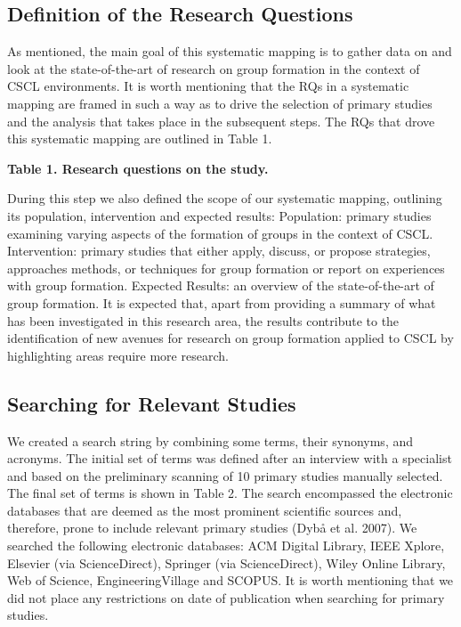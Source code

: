 \subsection{Definition of the Research Questions}
 
As mentioned, the main goal of this systematic mapping is to gather data on and look at the state-of-the-art of research on group formation in the context of CSCL environments. It is worth mentioning that the RQs in a systematic mapping are framed in such a way as to drive the selection of primary studies and the analysis that takes place in the subsequent steps. The RQs that drove this systematic mapping are outlined in Table 1.

\textbf{Table 1. Research questions on the study.}

During this step we also defined the scope of our systematic mapping, outlining its population, intervention and expected results: 
Population: primary studies examining varying aspects of the formation of groups in the context of CSCL.
Intervention: primary studies that either apply, discuss, or propose strategies, approaches methods, or techniques for group formation or report on experiences with group formation.
Expected Results: an overview of the state-of-the-art of group formation. It is expected that, apart from providing a summary of what has been investigated in this research area, the results contribute to the identification of new avenues for research on group formation applied to CSCL by highlighting areas require more research.

\subsection{Searching for Relevant Studies}

We created a search string by combining some terms, their synonyms, and acronyms. The initial set of terms was defined after an interview with a specialist and based on the preliminary scanning of 10 primary studies manually selected. The final set of terms is shown in Table 2. The search encompassed the electronic databases that are deemed as the most prominent scientific sources and, therefore, prone to include relevant primary studies (Dybå et al. 2007). We searched the following electronic databases: ACM Digital Library, IEEE Xplore, Elsevier (via ScienceDirect), Springer (via ScienceDirect), Wiley Online Library, Web of Science, EngineeringVillage and SCOPUS. It is worth mentioning that we did not place any restrictions on date of publication when searching for primary studies. 

